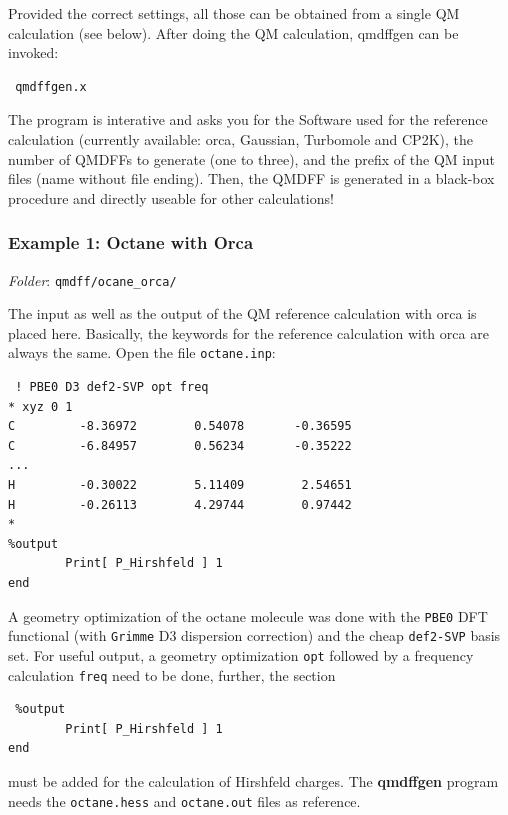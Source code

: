 \documentclass[12pt,a4paper]{scrartcl}
\begin{document}
Provided the correct settings, all those can be obtained from a single QM calculation (see below).
After doing the QM calculation, qmdffgen can be invoked:

\begin{verbatim}
 qmdffgen.x
\end{verbatim}

The program is interative and asks you for the Software used for the reference calculation
(currently available: orca, Gaussian, Turbomole and CP2K), the number of QMDFFs to generate 
(one to three), and the prefix of the QM input files (name without file ending).
Then, the QMDFF is generated in a black-box procedure and directly useable for other calculations!

 
\subsubsection{Example 1: Octane with Orca} 

\textit{Folder}: \texttt{qmdff/ocane\_orca/} \newline

The input as well as the output of the QM reference calculation with orca is placed here.
Basically, the keywords for the reference calculation with orca are always the same.
Open the file \texttt{octane.inp}:

\begin{verbatim}
 ! PBE0 D3 def2-SVP opt freq
* xyz 0 1
C         -8.36972        0.54078       -0.36595
C         -6.84957        0.56234       -0.35222
...
H         -0.30022        5.11409        2.54651
H         -0.26113        4.29744        0.97442
*
%output
        Print[ P_Hirshfeld ] 1
end
\end{verbatim}

A geometry optimization of the octane molecule was done with the \texttt{PBE0} DFT functional
(with \texttt{Grimme} D3 dispersion correction) and the cheap \texttt{def2-SVP} basis set.
For useful output, a geometry optimization \texttt{opt} followed by a frequency calculation 
\texttt{freq} need to be done, further, the section

\begin{verbatim}
 %output
        Print[ P_Hirshfeld ] 1
end
\end{verbatim}

must be added for the calculation of Hirshfeld charges.
The \textbf{qmdffgen} program needs the \texttt{octane.hess} and \texttt{octane.out} files 
as reference. 
\end{document}
